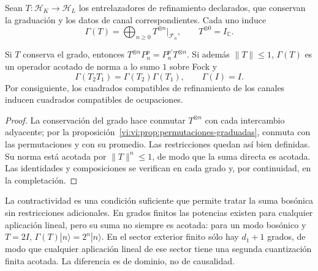 Sean \(T:\mathcal H_K\to\mathcal H_L\) los entrelazadores
de refinamiento declarados, que conservan la graduación y los
datos de canal correspondientes. Cada uno induce
\begin{equation}
 \Gamma(T)=\bigoplus_{n\ge0}T^{\otimes n}|_{\mathcal F_n},
 \qquad T^{\otimes0}=I_{\mathbb C}.
 \label{vi:vi:eq:segunda-cuantizacion-transporte}
\end{equation}

\begin{theorem}
\label{vi:vi:thm:fock-naturalidad}
Si \(T\) conserva el grado, entonces
\(T^{\otimes n}P_n^p=P_n^{p'}T^{\otimes n}\).
Si además \(\|T\|\le1\), \(\Gamma(T)\) es un operador
acotado de norma a lo sumo \(1\) sobre Fock y
\[
 \Gamma(T_2T_1)=\Gamma(T_2)\Gamma(T_1),\qquad
 \Gamma(I)=I.
\]
Por consiguiente, los cuadrados compatibles de refinamiento
de los canales inducen cuadrados compatibles de ocupaciones.
\end{theorem}
\begin{proof}
La conservación del grado hace conmutar \(T^{\otimes n}\)
con cada intercambio adyacente; por la
proposición~\ref{vi:vi:prop:permutaciones-graduadas}, conmuta
con las permutaciones y con su promedio. Las restricciones
quedan así bien definidas. Su norma está acotada por
\(\|T\|^n\le1\), de modo que la suma directa es acotada.
Las identidades y composiciones se verifican en cada grado
y, por continuidad, en la completación.
\end{proof}

La contractividad es una condición suficiente que permite tratar
la suma bosónica sin restricciones adicionales. En grados finitos
las potencias existen para cualquier aplicación lineal, pero su
suma no siempre es acotada: para un modo bosónico y \(T=2I\),
\(\Gamma(T)|n\rangle=2^n|n\rangle\). En el sector exterior
finito sólo hay \(d_1+1\) grados, de modo que cualquier
aplicación lineal de ese sector tiene una segunda cuantización
finita acotada. La diferencia es de dominio, no de causalidad.


